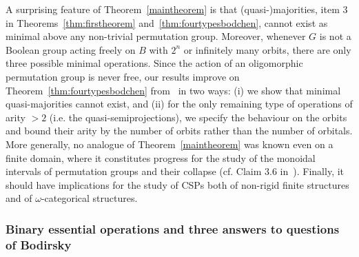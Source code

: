 \documentclass{article}
\theoremstyle{remark}
\theoremstyle{definition}
\begin{document}
A surprising feature of Theorem~\ref{maintheorem} is that (quasi-)majorities, item 3 in Theorems~\ref{thm:firstheorem} and~\ref{thm:fourtypesbodchen}, cannot exist as minimal above any non-trivial permutation group. Moreover, whenever $G$ is not a Boolean group acting freely on $B$ with $2^n$ or infinitely many orbits, there are only three possible minimal operations. Since the action of an oligomorphic permutation group is never free, our results improve on Theorem~\ref{thm:fourtypesbodchen} from~\cite{BodChen} in two ways: (i) we show that minimal quasi-majorities cannot exist, and (ii)  for the only remaining type of operations of arity $>2$ (i.e. the quasi-semiprojections), we specify the behaviour on the orbits and bound their arity by the number of orbits rather than the number of orbitals. More generally, no analogue of Theorem~\ref{maintheorem} was known even on a finite domain, where it constitutes progress for the study of the monoidal intervals of permutation groups and their collapse (cf. Claim 3.6 in~\cite{kearnes2001collapsing}). Finally, it should have implications for the study of CSPs both of non-rigid finite structures and of $\omega$-categorical structures.



\subsubsection{Binary essential operations and three answers to questions of Bodirsky}
\end{document}
